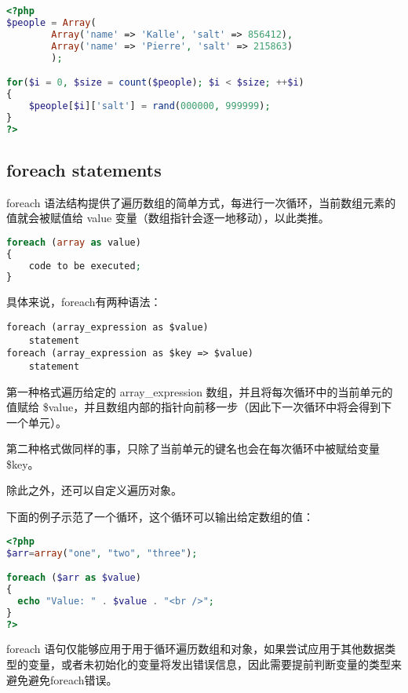 \begin{lstlisting}[language=PHP]
<?php
$people = Array(
        Array('name' => 'Kalle', 'salt' => 856412), 
        Array('name' => 'Pierre', 'salt' => 215863)
        );

for($i = 0, $size = count($people); $i < $size; ++$i)
{
    $people[$i]['salt'] = rand(000000, 999999);
}
?>
\end{lstlisting}


\subsection{foreach statements}



foreach 语法结构提供了遍历数组的简单方式，每进行一次循环，当前数组元素的值就会被赋值给 value 变量（数组指针会逐一地移动），以此类推。


\begin{lstlisting}[language=PHP]
foreach (array as value)
{
    code to be executed;
}
\end{lstlisting}

具体来说，foreach有两种语法：

\begin{verbatim}
foreach (array_expression as $value)
    statement
foreach (array_expression as $key => $value)
    statement
\end{verbatim}

\begin{compactitem}
\item 第一种格式遍历给定的 array\_expression 数组，并且将每次循环中的当前单元的值赋给 \$value，并且数组内部的指针向前移一步（因此下一次循环中将会得到下一个单元）。
\item 第二种格式做同样的事，只除了当前单元的键名也会在每次循环中被赋给变量 \$key。
\end{compactitem}

除此之外，还可以自定义遍历对象。



下面的例子示范了一个循环，这个循环可以输出给定数组的值：

\begin{lstlisting}[language=PHP]
<?php
$arr=array("one", "two", "three");

foreach ($arr as $value)
{
  echo "Value: " . $value . "<br />";
}
?>
\end{lstlisting}

foreach 语句仅能够应用于用于循环遍历数组和对象，如果尝试应用于其他数据类型的变量，或者未初始化的变量将发出错误信息，因此需要提前判断变量的类型来避免避免foreach错误。

